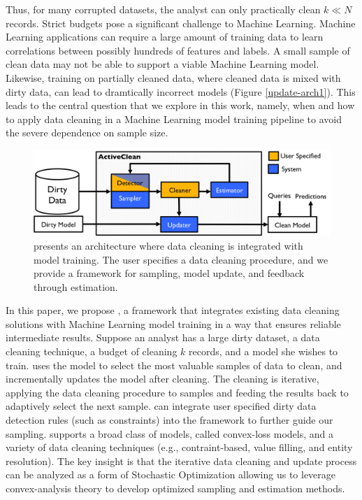 Thus, for many corrupted datasets, the analyst can only practically clean $k \ll N$ records.
Strict budgets pose a significant challenge to Machine Learning.
Machine Learning applications can require a large amount of training data to learn correlations between possibly hundreds of features and labels.
A small sample of clean data may not be able to support a viable Machine Learning model.
Likewise, training on partially cleaned data, where cleaned data is mixed with dirty data, can lead to dramtically incorrect models (Figure \ref{update-arch1}).
This leads to the central question that we explore in this work, namely, when and how to apply data cleaning in a Machine Learning model training pipeline to avoid the severe dependence on sample size.

\begin{figure}[t]
\centering
 \includegraphics[width=\columnwidth]{figs/arch.png}
 \caption{\sysfull presents an architecture where data cleaning is integrated with model training. The user specifies a data cleaning procedure, and we provide a framework for sampling, model update, and feedback through estimation. \label{sys-arch}}\vspace{-2em}
\end{figure}

In this paper, we propose \sys, a framework that integrates existing data cleaning solutions with Machine Learning model training in a way that ensures reliable intermediate results.
Suppose an analyst has a large dirty dataset, a data cleaning technique, a budget of cleaning $k$ records, and a model she wishes to train.
\sys uses the model to select the most valuable samples of data to clean, and incrementally updates the model after cleaning.
The cleaning is iterative, applying the data cleaning procedure to samples and feeding the results back to adaptively select the next sample. 
\sys can integrate user specified dirty data detection rules (such as constraints) into the framework to further guide our sampling.
\sys supports a broad class of models, called convex-loss models, and a variety of data cleaning techniques (e.g., contraint-based, value filling, and entity resolution).
The key insight is that the iterative data cleaning and update process can be analyzed as a form of Stochastic Optimization \cite{bertsekas2011incremental} allowing us to leverage convex-analysis theory to develop optimized sampling and estimation methods.


